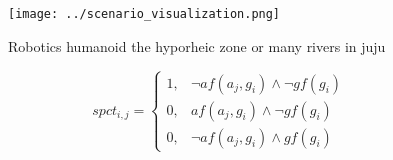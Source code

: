 \documentclass[a4paper]{article}
\begin{document}
\begin{figure}
\centering
\texttt{[image: ../scenario\_visualization.png]}
\caption{Robotics humanoid the hyporheic zone or many rivers in juju
}
\end{figure}
 
\begin{equation}
spct_{i,j} =
\begin{cases}
1, & \text{$\neg af(a_j,g_i) \wedge \neg gf(g_i)$}\\
0, & \text{$af(a_j,g_i) \wedge \neg gf(g_i)$}\\
0, & \text{$\neg af(a_j,g_i) \wedge gf(g_i)$}
\end{cases}
\end{equation}
\end{document}
